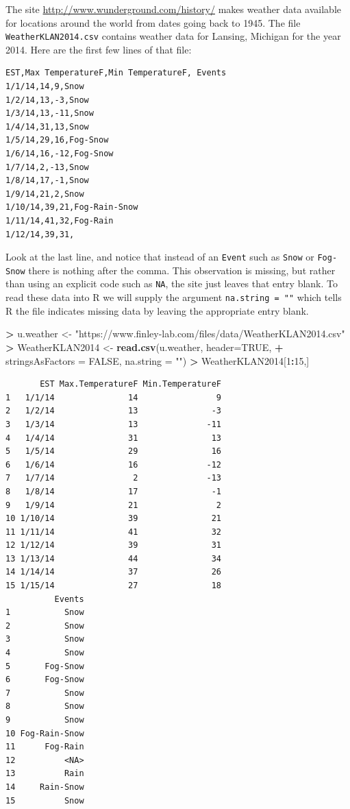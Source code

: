 \documentclass[
]{krantz}
\makeatletter
\newenvironment{Shaded}{\begin{snugshade}}{\end{snugshade}}
\newcommand{\DataTypeTok}[1]{\textcolor[rgb]{0.27,0.27,0.27}{#1}}
\newcommand{\DecValTok}[1]{\textcolor[rgb]{0.06,0.06,0.06}{#1}}
\newcommand{\KeywordTok}[1]{\textcolor[rgb]{0.27,0.27,0.27}{\textbf{#1}}}
\newcommand{\NormalTok}[1]{#1}
\newcommand{\OperatorTok}[1]{\textcolor[rgb]{0.43,0.43,0.43}{\textbf{#1}}}
\newcommand{\OtherTok}[1]{\textcolor[rgb]{0.37,0.37,0.37}{#1}}
\newcommand{\StringTok}[1]{\textcolor[rgb]{0.5,0.5,0.5}{#1}}
\newenvironment{kframe}{%
\medskip{}
\setlength{\fboxsep}{.8em}
 \def\at@end@of@kframe{}%
 \ifinner\ifhmode%
  \def\at@end@of@kframe{\end{minipage}}%
  \begin{minipage}{\columnwidth}%
 \fi\fi%
 \def\FrameCommand##1{\hskip\@totalleftmargin \hskip-\fboxsep
 \colorbox{shadecolor}{##1}\hskip-\fboxsep
     \hskip-\linewidth \hskip-\@totalleftmargin \hskip\columnwidth}%
 \MakeFramed {\advance\hsize-\width
   \@totalleftmargin\z@ \linewidth\hsize
   \@setminipage}}%
 {\par\unskip\endMakeFramed%
 \at@end@of@kframe}
\renewenvironment{Shaded}{\begin{kframe}}{\end{kframe}}
\makeatother
\begin{document}
The site \url{http://www.wunderground.com/history/} makes weather data available for locations around the world from dates going back to 1945. The file \texttt{WeatherKLAN2014.csv} contains weather data for Lansing, Michigan for the year 2014. Here are the first few lines of that file:

\begin{verbatim}
EST,Max TemperatureF,Min TemperatureF, Events
1/1/14,14,9,Snow
1/2/14,13,-3,Snow
1/3/14,13,-11,Snow
1/4/14,31,13,Snow
1/5/14,29,16,Fog-Snow
1/6/14,16,-12,Fog-Snow
1/7/14,2,-13,Snow
1/8/14,17,-1,Snow
1/9/14,21,2,Snow
1/10/14,39,21,Fog-Rain-Snow
1/11/14,41,32,Fog-Rain
1/12/14,39,31,
\end{verbatim}

Look at the last line, and notice that instead of an \texttt{Event} such as \texttt{Snow} or \texttt{Fog-Snow} there is nothing after the comma. This observation is missing, but rather than using an explicit code such as \texttt{NA}, the site just leaves that entry blank. To read these data into R we will supply the argument \texttt{na.string\ =\ ""} which tells R the file indicates missing data by leaving the appropriate entry blank.

\begin{Shaded}
\begin{Highlighting}[]
\OperatorTok{\textgreater{}}\StringTok{ }\NormalTok{u.weather \textless{}{-}}\StringTok{ "https://www.finley{-}lab.com/files/data/WeatherKLAN2014.csv"}
\OperatorTok{\textgreater{}}\StringTok{ }\NormalTok{WeatherKLAN2014 \textless{}{-}}\StringTok{ }\KeywordTok{read.csv}\NormalTok{(u.weather, }\DataTypeTok{header=}\OtherTok{TRUE}\NormalTok{, }
\OperatorTok{+}\StringTok{                             }\DataTypeTok{stringsAsFactors =} \OtherTok{FALSE}\NormalTok{, }\DataTypeTok{na.string =} \StringTok{""}\NormalTok{)}
\OperatorTok{\textgreater{}}\StringTok{ }\NormalTok{WeatherKLAN2014[}\DecValTok{1}\OperatorTok{:}\DecValTok{15}\NormalTok{,]}
\end{Highlighting}
\end{Shaded}

\begin{verbatim}
       EST Max.TemperatureF Min.TemperatureF
1   1/1/14               14                9
2   1/2/14               13               -3
3   1/3/14               13              -11
4   1/4/14               31               13
5   1/5/14               29               16
6   1/6/14               16              -12
7   1/7/14                2              -13
8   1/8/14               17               -1
9   1/9/14               21                2
10 1/10/14               39               21
11 1/11/14               41               32
12 1/12/14               39               31
13 1/13/14               44               34
14 1/14/14               37               26
15 1/15/14               27               18
          Events
1           Snow
2           Snow
3           Snow
4           Snow
5       Fog-Snow
6       Fog-Snow
7           Snow
8           Snow
9           Snow
10 Fog-Rain-Snow
11      Fog-Rain
12          <NA>
13          Rain
14     Rain-Snow
15          Snow
\end{verbatim}
\end{document}
